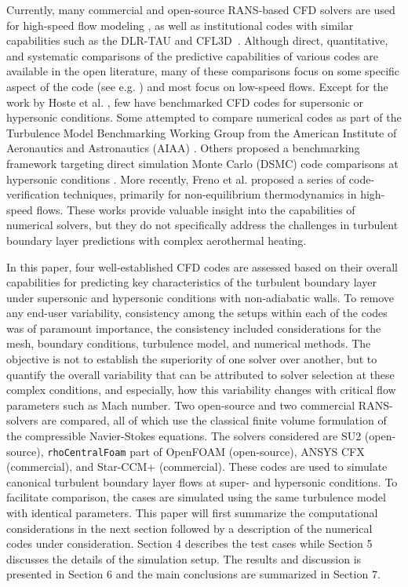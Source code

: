 \documentclass[journal ]{new-aiaa}
\begin{document}
Currently, many commercial and open-source RANS-based CFD solvers are used for high-speed flow modeling \cite{SiemensPLM, SU2}, as well as institutional codes with similar capabilities such as the DLR-TAU \cite{hannemann2010methodology} and CFL3D~\cite{CFL3D}. Although direct, quantitative, and systematic comparisons of the predictive capabilities of various codes are available in the open literature, many of these comparisons focus on  some specific aspect of the code (see e.g. \cite{haren2011testing,winter2014benchmark,Greifzu2016,BAYON2016322,zou2018comparison}) and most focus on low-speed flows. Except for the work by Hoste et al. \cite{Hoste2017}, few have benchmarked CFD codes for supersonic or hypersonic conditions. Some attempted to compare numerical codes as part of the Turbulence Model Benchmarking Working Group from the American Institute of Aeronautics and Astronautics (AIAA) \cite{Rumsey2014, RumseyBenchmarking}. Others proposed a benchmarking framework targeting direct simulation Monte Carlo (DSMC) code comparisons at hypersonic conditions \cite{Abdul2012}. More recently, Freno et al. \cite{FRENO2021109752} proposed a series of code-verification techniques, primarily for non-equilibrium thermodynamics in high-speed flows. These works provide valuable insight into the capabilities of numerical solvers, but they do not specifically address the challenges in turbulent boundary layer predictions with complex aerothermal heating.

In this paper, four well-established CFD codes are assessed based on their overall capabilities for predicting key characteristics of the turbulent boundary layer under supersonic and hypersonic conditions with non-adiabatic walls. To remove any end-user variability,  consistency among the setups within each of the codes was of paramount importance, the consistency included considerations for the mesh, boundary conditions, turbulence model, and numerical methods. The objective is not to establish the superiority of one solver over another, but to quantify the overall variability that can be attributed to solver selection at these complex conditions, and especially, how this variability changes with critical flow parameters such as Mach number. Two open-source and two commercial RANS-solvers are compared, all of which use the classical finite volume formulation of the compressible Navier-Stokes equations. The solvers considered are SU2 (open-source), \texttt{rhoCentralFoam} part of OpenFOAM (open-source), ANSYS CFX (commercial), and Star-CCM+ (commercial). These codes are used to simulate canonical turbulent boundary layer flows at super- and hypersonic conditions. To facilitate comparison, the cases are simulated using the same turbulence model with identical parameters. This paper will first summarize the computational considerations in the next section followed by a description of the numerical codes under consideration. Section 4 describes the test cases while Section 5 discusses the details of the simulation setup. The results and discussion is presented in Section 6 and the main conclusions are summarized in Section 7.
\end{document}
